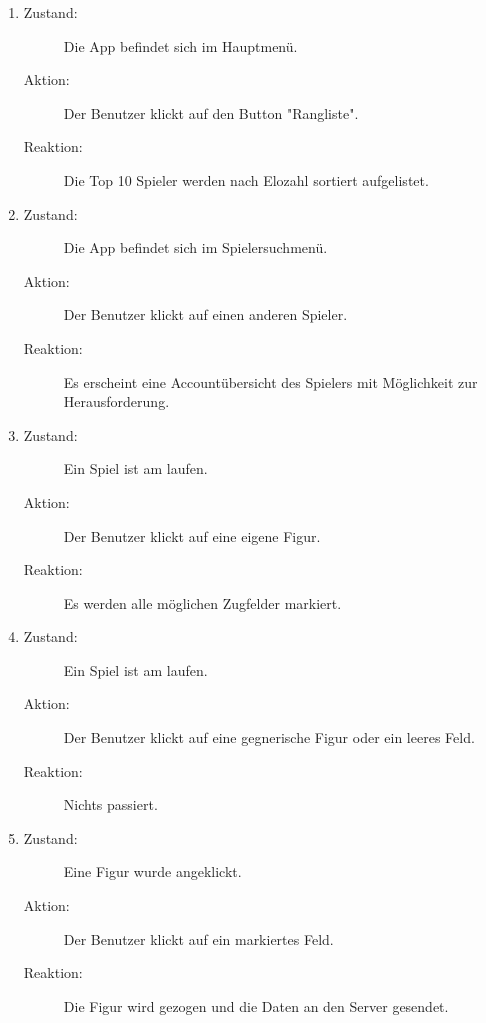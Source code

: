 \documentclass[parskip=full]{scrartcl}
\begin{document}
\begin{enumerate}
	\item
	\begin{description}
	\item[Zustand:] Die App befindet sich im Hauptmenü.
	\item[Aktion:] Der Benutzer klickt auf den Button "Rangliste".
	\item[Reaktion:] Die Top 10 Spieler werden nach Elozahl sortiert aufgelistet.  \\
	\end{description}
	
	\item
	\begin{description}
	\item[Zustand:] Die App befindet sich im Spielersuchmenü.
	\item[Aktion:] Der Benutzer klickt auf einen anderen Spieler.
	\item[Reaktion:] Es erscheint eine Accountübersicht des Spielers mit Möglichkeit zur Herausforderung.  \\
	\end{description}
	
	\item 
	\begin{description}
	\item[Zustand:] Ein Spiel ist am laufen.
	\item[Aktion:] Der Benutzer klickt auf eine eigene Figur.
	\item[Reaktion:] Es werden alle möglichen Zugfelder markiert.  \\
	\end{description}
	
	\item 
	\begin{description}
	\item[Zustand:] Ein Spiel ist am laufen.
	\item[Aktion:] Der Benutzer klickt auf eine gegnerische Figur oder ein leeres Feld.
	\item[Reaktion:] Nichts passiert.  \\
	\end{description}
	
	
	\item
	\begin{description}
	\item[Zustand:] Eine Figur wurde angeklickt.
	\item[Aktion:] Der Benutzer klickt auf ein markiertes Feld.
	\item[Reaktion:] Die Figur wird gezogen und die Daten an den Server gesendet.  \\
	\end{description}
	

\end{enumerate}
\end{document}
